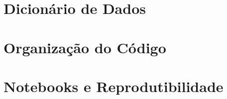 
\begin{apendicesenv}
    \partapendices\sloppy

    \chapter{Dicionário de Dados}\label{ap:dicionario}
    

    \chapter{Organização do Código}\label{ap:codigo}
    

    \chapter{Notebooks e Reprodutibilidade}\label{ap:notebooks}
    

\end{apendicesenv}
